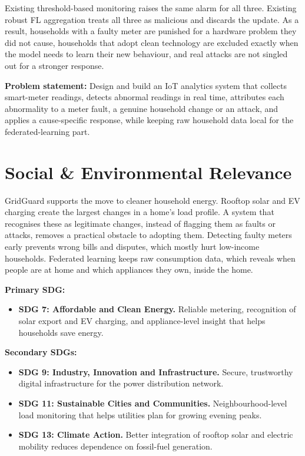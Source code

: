\documentclass[12pt,a4paper,oneside]{report}
\begin{document}
Existing threshold-based monitoring raises the same alarm for all three. Existing robust FL aggregation treats all three as malicious and discards the update. As a result, households with a faulty meter are punished for a hardware problem they did not cause, households that adopt clean technology are excluded exactly when the model needs to learn their new behaviour, and real attacks are not singled out for a stronger response.

\textbf{Problem statement:} Design and build an IoT analytics system that collects smart-meter readings, detects abnormal readings in real time, attributes each abnormality to a meter fault, a genuine household change or an attack, and applies a cause-specific response, while keeping raw household data local for the federated-learning part.

\section{Social \& Environmental Relevance}

GridGuard supports the move to cleaner household energy. Rooftop solar and EV charging create the largest changes in a home's load profile. A system that recognises these as legitimate changes, instead of flagging them as faults or attacks, removes a practical obstacle to adopting them. Detecting faulty meters early prevents wrong bills and disputes, which mostly hurt low-income households. Federated learning keeps raw consumption data, which reveals when people are at home and which appliances they own, inside the home.

\textbf{Primary SDG:}
\begin{itemize}
\item \textbf{SDG 7: Affordable and Clean Energy.} Reliable metering, recognition of solar export and EV charging, and appliance-level insight that helps households save energy.
\end{itemize}

\textbf{Secondary SDGs:}
\begin{itemize}
\item \textbf{SDG 9: Industry, Innovation and Infrastructure.} Secure, trustworthy digital infrastructure for the power distribution network.
\item \textbf{SDG 11: Sustainable Cities and Communities.} Neighbourhood-level load monitoring that helps utilities plan for growing evening peaks.
\item \textbf{SDG 13: Climate Action.} Better integration of rooftop solar and electric mobility reduces dependence on fossil-fuel generation.
\end{itemize}
\end{document}
